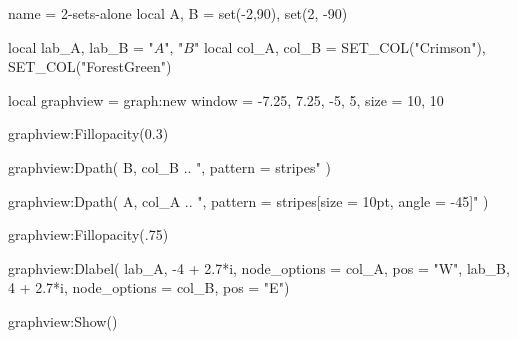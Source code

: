 \documentclass{standalone}
\begin{document}
\begin{luadraw}{name = 2-sets-alone}
  local A, B = set(-2,90), set(2, -90)

  local lab_A, lab_B = "$A$", "$B$"
  local col_A, col_B = SET_COL("Crimson"), SET_COL("ForestGreen")

  local graphview = graph:new{
    window = {-7.25, 7.25, -5, 5},
    size   = {10, 10}
  }

  graphview:Fillopacity(0.3)

  graphview:Dpath(
    B,
    col_B .. ", pattern = stripes"
  )

  graphview:Dpath(
    A,
    col_A .. ", pattern = {stripes[size = 10pt, angle = -45]}"
  )

  graphview:Fillopacity(.75)

  graphview:Dlabel(
    lab_A, -4 + 2.7*i, {node_options = col_A, pos = "W"},
    lab_B,  4 + 2.7*i, {node_options = col_B, pos = "E"})

  graphview:Show()
\end{luadraw}
\end{document}
